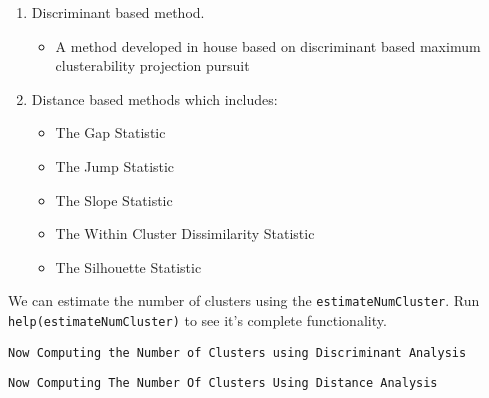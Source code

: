 \documentclass[
  letterpaper,
  DIV=11,
  numbers=noendperiod]{scrreprt}
\newenvironment{Shaded}{\begin{snugshade}}{\end{snugshade}}
\newcommand{\AttributeTok}[1]{\textcolor[rgb]{0.40,0.45,0.13}{#1}}
\newcommand{\CommentTok}[1]{\textcolor[rgb]{0.37,0.37,0.37}{#1}}
\newcommand{\DecValTok}[1]{\textcolor[rgb]{0.68,0.00,0.00}{#1}}
\newcommand{\FunctionTok}[1]{\textcolor[rgb]{0.28,0.35,0.67}{#1}}
\newcommand{\NormalTok}[1]{\textcolor[rgb]{0.00,0.23,0.31}{#1}}
\newcommand{\OtherTok}[1]{\textcolor[rgb]{0.00,0.23,0.31}{#1}}
\newcommand{\SpecialCharTok}[1]{\textcolor[rgb]{0.37,0.37,0.37}{#1}}
\newcommand{\StringTok}[1]{\textcolor[rgb]{0.13,0.47,0.30}{#1}}
\providecommand{\tightlist}{%
  \setlength{\itemsep}{0pt}\setlength{\parskip}{0pt}}\usepackage{longtable,booktabs,array}
\begin{document}
\begin{enumerate}
\def\labelenumi{\arabic{enumi}.}
\tightlist
\item
  Discriminant based method.

  \begin{itemize}
  \tightlist
  \item
    A method developed in house based on discriminant based maximum
    clusterability projection pursuit
  \end{itemize}
\item
  Distance based methods which includes:

  \begin{itemize}
  \tightlist
  \item
    The Gap Statistic
  \item
    The Jump Statistic
  \item
    The Slope Statistic
  \item
    The Within Cluster Dissimilarity Statistic
  \item
    The Silhouette Statistic
  \end{itemize}
\end{enumerate}

We can estimate the number of clusters using the
\texttt{estimateNumCluster}. Run \texttt{help(estimateNumCluster)} to
see it's complete functionality.

\begin{Shaded}
\end{Shaded}

\begin{verbatim}
Now Computing the Number of Clusters using Discriminant Analysis
\end{verbatim}

\begin{verbatim}
Now Computing The Number Of Clusters Using Distance Analysis
\end{verbatim}
\end{document}
